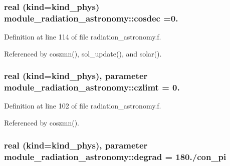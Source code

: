 \subsubsection[{\texorpdfstring{cosdec}{cosdec}}]{\setlength{\rightskip}{0pt plus 5cm}real (kind=kind\+\_\+phys) module\+\_\+radiation\+\_\+astronomy\+::cosdec =0.\hspace{0.3cm}{\ttfamily [private]}}\hypertarget{group__module__radiation__astronomy_ga07386e90045639b8023abd826e0e2768}{}\label{group__module__radiation__astronomy_ga07386e90045639b8023abd826e0e2768}


Definition at line 114 of file radiation\+\_\+astronomy.\+f.



Referenced by coszmn(), sol\+\_\+update(), and solar().

\subsubsection[{\texorpdfstring{czlimt}{czlimt}}]{\setlength{\rightskip}{0pt plus 5cm}real (kind=kind\+\_\+phys), parameter module\+\_\+radiation\+\_\+astronomy\+::czlimt = 0.\hspace{0.3cm}{\ttfamily [private]}}\hypertarget{group__module__radiation__astronomy_gafeb2fccbe8137de6099a09035762ff5e}{}\label{group__module__radiation__astronomy_gafeb2fccbe8137de6099a09035762ff5e}


Definition at line 102 of file radiation\+\_\+astronomy.\+f.



Referenced by coszmn().

\subsubsection[{\texorpdfstring{degrad}{degrad}}]{\setlength{\rightskip}{0pt plus 5cm}real (kind=kind\+\_\+phys), parameter module\+\_\+radiation\+\_\+astronomy\+::degrad = 180./con\+\_\+pi\hspace{0.3cm}{\ttfamily [private]}}\hypertarget{group__module__radiation__astronomy_ga220d2b997b3073cf2985d62111c5405d}{}\label{group__module__radiation__astronomy_ga220d2b997b3073cf2985d62111c5405d}


